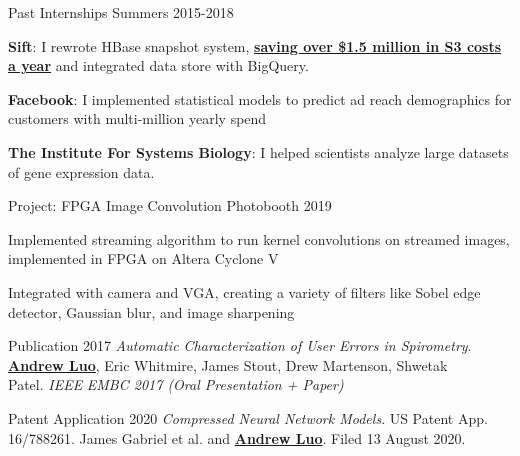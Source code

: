 
\begin{cventries}
  \vspace{-0.5em}
  \cventry
    {Past Internships}
    {}
    {}
    {Summers 2015-2018}
    {
      \begin{cvitems}
        \item {\textbf{Sift}: I rewrote HBase snapshot system, \underline{\textbf{saving over \$1.5 million in S3 costs a year}} and integrated data store with BigQuery.}
		\item {\textbf{Facebook}: I implemented statistical models to predict ad reach demographics for customers with multi-million yearly spend}
		\item {\textbf{The Institute For Systems Biology}: I helped scientists analyze large datasets of gene expression data.}
      \end{cvitems}
    }
  \vspace{-0.5em}
\end{cventries}

\begin{cventries}
  \vspace{-0.5em}
  \cventry
    {Project: FPGA Image Convolution Photobooth}
    {}
    {}
    {2019}
    {
    \begin{cvitems}
	\item {Implemented streaming algorithm to run kernel convolutions on streamed images, implemented in FPGA on Altera Cyclone V}
    \item {Integrated with camera and VGA, creating a variety of filters like Sobel edge detector, Gaussian blur, and image sharpening}
    \end{cvitems}
    }
  \vspace{-0.5em}
\end{cventries}

\begin{cventries}
  \vspace{-0.5em}
  \cventry
    {Publication}
    {}
    {}
    {2017}
    {
    \textit{Automatic Characterization of User Errors in Spirometry}. \underline{\textbf{Andrew Luo}}, Eric Whitmire,
 James Stout, Drew Martenson, Shwetak \textcolor{white}{aaaaa} Patel. \textit{IEEE} \textit{EMBC 2017 (Oral Presentation + Paper)}}
  \vspace{-0.17em}
\end{cventries}

\begin{cventries}
  \vspace{-0.17em}
  \cventry
    {Patent Application}
    {}
    {}
    {2020}
    {
    \textit{Compressed Neural Network Models}. US Patent App. 16/788261. James Gabriel et al. and \underline{\textbf{Andrew Luo}}. Filed 13 August 2020.}
  \vspace{-0.5em}
\end{cventries}